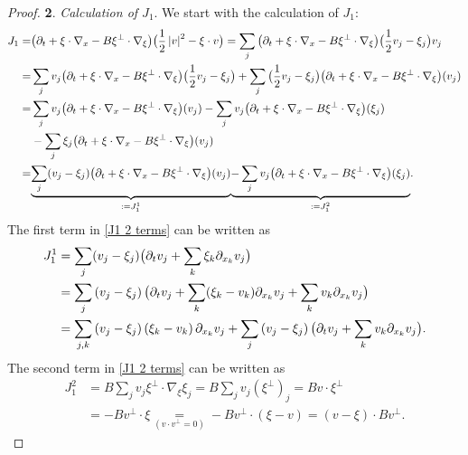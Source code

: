 \documentclass[11pt,reqno]{amsart}
\numberwithin{equation}{section}
\begin{document}
\begin{proof}
\smallskip
\textbf{2}. \textit{Calculation of $J_{1}$}. We start with the calculation of  $J_{1}$: 
\begin{align}
J_{1}=&\big(\partial_{t}+\xi\cdot \nabla_{x}-B\xi^{\perp}\cdot\nabla_{\xi}\big)\big(\frac{1}{2}\left\vert v\right\vert^{2}-\xi\cdot v \big)
=\sum_{j}\big(\partial_{t}+\xi\cdot \nabla_{x}-B\xi^{\perp}\cdot\nabla_{\xi}\big)\big(\frac{1}{2}v_{j}-\xi_{j}\big)v_{j}\notag\\
=&\sum_{j}v_{j}\big(\partial_{t}+\xi\cdot \nabla_{x}-B\xi^{\perp}\cdot \nabla_{\xi}\big)\big(\frac{1}{2}v_{j}-\xi_{j}\big) \notag
+\sum_{j}\big(\frac{1}{2}v_{j}-\xi_{j}\big)
\big(\partial_{t}+\xi\cdot\nabla_{x}-B\xi^{\perp}\cdot \nabla_{\xi}\big)(v_{j}) \notag\\
=&\sum_{j}v_{j}\big(\partial_{t}+\xi\cdot \nabla_{x}-B\xi^{\perp}\cdot \nabla_{\xi}\big)(v_{j})
-\sum_{j}v_{j}\big(\partial_{t}+\xi\cdot \nabla_{x}-B\xi^{\perp}\cdot \nabla_{\xi}\big)(\xi_{j}) \notag\\
&-\sum_{j}\xi_{j}\big(\partial_{t}+\xi\cdot \nabla_{x}-B\xi^{\perp}\cdot\nabla_{\xi}\big)(v_{j})\notag\\
=&\underset{:= J_{1}^{1}}{\underbrace{\sum_{j}(v_{j}-\xi_{j})\big(\partial_{t}+\xi\cdot \nabla_{x}-B\xi^{\perp}\cdot \nabla_{\xi}\big)(v_{j})}}\underset{:= J_{1}^{2}}{\underbrace{-\sum_{j}v_{j}\big(\partial_{t}+\xi\cdot \nabla_{x}-B\xi^{\perp}\cdot \nabla_{\xi}\big)(\xi_{j})}}. \label{J1 2 terms}
\end{align}
The first term in \eqref{J1 2 terms} can be written as  
\begin{align}
J_{1}^{1}&=\sum_{j}(v_{j}-\xi_{j})\big(\partial_{t}v_{j}+\sum_{k}\xi_{k}\partial_{x_{k}}v_{j}\big) \notag\\
&=\sum_{j}\left(v_{j}-\xi_{j}\right)\big(\partial_{t}v_{j}+\sum_{k}(\xi_{k}-v_{k})\partial_{x_{k}}v_{j}+\sum_{k}v_{k}\partial_{x_{k}}v_{j}\big) \notag\\
&=\sum_{j,k} \left(v_{j}-\xi_{j}\right)\left(\xi_{k}-v_{k}\right)\partial_{x_{k}}v_{j} +\sum_{j}\left(v_{j}-\xi_{j}\right)\big(\partial_{t}v_{j}+\sum_{k}v_{k}\partial_{x_{k}}v_{j}\big). 
\label{J11}
\end{align}
The second term in \eqref{J1 2 terms} can be written as 
\begin{align}
J_{1}^{2}
&=B\sum_{j}v_{j}\xi^{\perp}\cdot\nabla_{\xi} \xi_{j}
=B\sum_{j}v_{j}(\xi^{\perp})_{j}=Bv\cdot \xi^{\perp} \nonumber\\
&=-Bv^{\perp}\cdot \xi
{\underset{(v\cdot v^{\perp}=0)}
{=}}
-B v^{\perp}\cdot(\xi-v)
=(v-\xi)\cdot B v^{\perp}.\label{J12}   

\end{align}
\end{proof}
\end{document}
